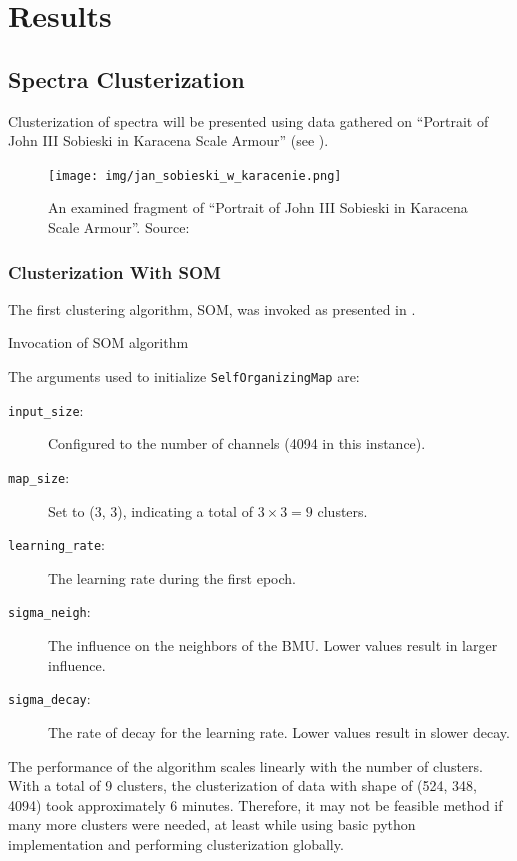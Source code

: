 \section{Results}
\subsection{Spectra Clusterization}
Clusterization of spectra will be presented using data gathered on ``Portrait of John III Sobieski in Karacena Scale Armour'' (see ).
\begin{figure}[H] 
  \centering     
  \texttt{[image: img/jan\_sobieski\_w\_karacenie.png]} 
  \caption{An examined fragment of ``Portrait of John III Sobieski in Karacena Scale Armour''. Source: \cite{wikimediaSobieskiPortrai} }
  \label{fig:sobieski_fragment}
\end{figure}

\subsubsection{Clusterization With SOM}
The first clustering algorithm, SOM, was invoked as presented in .
\newenvironment{longlistingG}{\captionsetup{type=listing, width=0.8\textwidth}}{}
\begin{longlistingG}
    \caption{Invocation of SOM algorithm}
    \label{lst:som-invocation}
\end{longlistingG}
\vspace{12pt}

The arguments used to initialize \texttt{SelfOrganizingMap} are:
\begin{description}
    \item[\texttt{input\_size}:] Configured to the number of channels (4094 in this instance).
    \item[\texttt{map\_size}:] Set to (3, 3), indicating a total of $3 \times 3 = 9$ clusters.
    \item[\texttt{learning\_rate}:] The learning rate during the first epoch.
    \item[\texttt{sigma\_neigh}:] The influence on the neighbors of the BMU. Lower values result in larger influence.
    \item[\texttt{sigma\_decay}:] The rate of decay for the learning rate. Lower values result in slower decay.
\end{description}
The performance of the algorithm scales linearly with the number of clusters. 
With a total of 9 clusters, the clusterization of data with shape of (524, 348, 4094) took approximately 6 minutes. 
Therefore, it may not be feasible method if many more clusters were needed, at least while using basic python implementation and performing clusterization globally.

